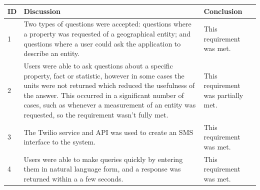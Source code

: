 \documentclass[authoryearcitations]{UoYCSproject}
\begin{document}
\begin{table}[h]
\begin{tabular}{|p{0.4cm}|p{9.0cm}|p{4.0cm}|}
\hline
ID & Discussion                                                                                                                                                                                                                                                                                                                                                                                                                                & Conclusion                          \\ \hline
1  & Two types of questions were accepted: questions where a property was requested of a geographical entity; and questions where a user could ask the application to describe an entity.                                                                                                                                                                                                                                                      & This requirement was met.           \\ \hline
2  & Users were able to ask questions about a specific property, fact or statistic, however in some cases the units were not returned which reduced the usefulness of the answer. This occurred in a significant number of cases, such as whenever a measurement of an entity was requested, so the requirement wasn't fully met.                                                                                                              & This requirement was partially met. \\ \hline
3  & The Twilio service and API was used to create an SMS interface to the system.                                                                                                                                                                                                                                                                                                                                                             & This requirement was met.           \\ \hline
4  & Users were able to make queries quickly by entering them in natural language form, and a response was returned within a a few seconds.                                                                                                                                                                                                                                                                                                    & This requirement was met.           \\ \hline

\end{tabular}
\end{table}
\end{document}
